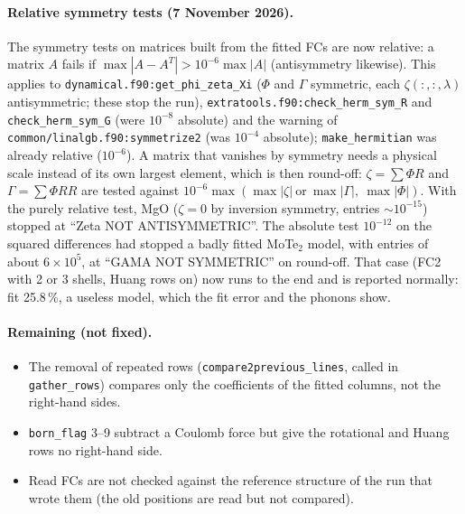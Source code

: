 \documentclass[11pt,a4paper]{article}
\newcommand{\code}[1]{\texttt{#1}}
\begin{document}
\paragraph{Relative symmetry tests (7 November 2026).} The symmetry tests on matrices built from the fitted FCs are now
relative: a matrix $A$ fails if $\max|A-A^T|>10^{-6}\max|A|$ (antisymmetry likewise). This applies to
\code{dynamical.f90:get\_phi\_zeta\_Xi} ($\Phi$ and $\Gamma$ symmetric, each $\zeta(:,:,\lambda)$ antisymmetric; these stop the
run), \code{extratools.f90:check\_herm\_sym\_R} and \code{check\_herm\_sym\_G} (were $10^{-8}$ absolute) and the warning of
\code{common/linalgb.f90:symmetrize2} (was $10^{-4}$ absolute); \code{make\_hermitian} was already relative ($10^{-6}$).
A matrix that vanishes by symmetry needs a physical scale instead of its own largest element, which is then round-off:
$\zeta=\sum\Phi R$ and $\Gamma=\sum\Phi RR$ are tested against $10^{-6}\max(\max|\zeta|\ \text{or}\ \max|\Gamma|,\ \max|\Phi|)$.
With the purely relative test, MgO ($\zeta=0$ by inversion symmetry, entries $\sim10^{-15}$) stopped at ``Zeta NOT
ANTISYMMETRIC''. The
absolute test $10^{-12}$ on the squared differences had stopped a badly fitted MoTe$_2$ model, with entries of about
$6\times10^5$, at ``GAMA NOT SYMMETRIC'' on round-off. That case (FC2 with 2 or 3 shells, Huang rows on) now runs to the end
and is reported normally: fit 25.8\,\%, a useless model, which the fit error and the phonons show.

\paragraph{Remaining (not fixed).}
\begin{itemize}
\item The removal of repeated rows (\code{compare2previous\_lines}, called in \code{gather\_rows}) compares only the
coefficients of the fitted columns, not the right-hand sides.
\item \code{born\_flag} 3--9 subtract a Coulomb force but give the rotational and Huang rows no right-hand side.
\item Read FCs are not checked against the reference structure of the run that wrote them (the old positions are read
but not compared).
\end{itemize}

\end{document}
